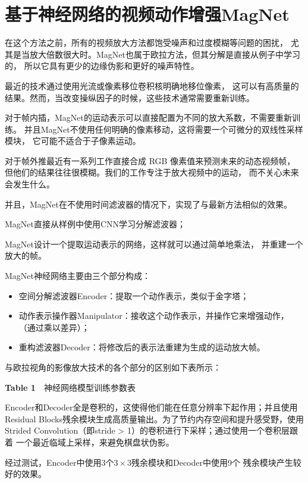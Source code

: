 \documentclass[AutoFakeBold]{MyFormat}
\begin{document}
\section{基于神经网络的视频动作增强MagNet}
\par 在这个方法之前，所有的视频放大方法都饱受噪声和过度模糊等问题的困扰，
尤其是当放大倍数很大时。MagNet也属于欧拉方法，但其分解是直接从例子中学习的，
所以它具有更少的边缘伪影和更好的噪声特性。
\par 最近的技术通过使用光流或像素移位卷积核明确地移位像素，
这可以有高质量的结果。然而，当改变操纵因子的时候，这些技术通常需要重新训练。
\par 对于帧内插，MagNet的运动表示可以直接配置为不同的放大系数，不需要重新训练。
并且MagNet不使用任何明确的像素移动，这将需要一个可微分的双线性采样模块，
它可能不适合于子像素运动。
\par 对于帧外推最近有一系列工作直接合成 RGB 像素值来预测未来的动态视频帧，
但他们的结果往往很模糊。我们的工作专注于放大视频中的运动，
而不关心未来会发生什么。
\par 并且，MagNet在不使用时间滤波器的情况下，实现了与最新方法相似的效果。
\par MagNet直接从样例中使用CNN学习分解滤波器；
\par MagNet设计一个提取运动表示的网络，这样就可以通过简单地乘法，
并重建一个放大的帧。
\par MagNet神经网络主要由三个部分构成：
\begin{itemize}
    \item 空间分解滤波器Encoder：提取一个动作表示，类似于金字塔；
    \item 动作表示操作器Manipulator：接收这个动作表示，并操作它来增强动作，
    （通过乘以差异）；
    \item 重构滤波器Decoder：将修改后的表示法重建为生成的运动放大帧。
\end{itemize}

\par 与欧拉视角的影像放大技术的各个部分的区别如下表所示：
\begin{center}
    \textbf{Table 1}~~神经网络模型训练参数表\\
\end{center}
\par Encoder和Decoder全是卷积的，这使得他们能在任意分辨率下起作用；并且使用
Residual Blocks残余模块生成高质量输出。为了节约内存空间和提升感受野，使用
Strided Convolution（即stride > 1）的卷积进行下采样；通过使用一个卷积层跟着
一个最近临域上采样，来避免棋盘状伪影。
\par 经过测试，Encoder中使用3个$3\times 3$残余模块和Decoder中使用9个
残余模块产生较好的效果。
\end{document}
